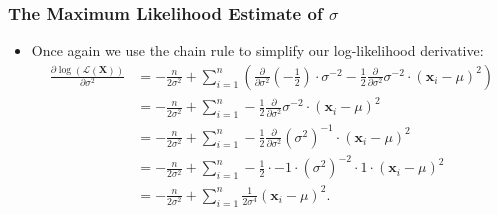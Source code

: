 \begin{frame}
	\frametitle{The Maximum Likelihood Estimate of $\sigma$}
	\begin{itemize}
		\item Once again we use the chain rule to simplify our log-likelihood derivative:
		      \begin{align}
			      \frac{\partial \log\left(\mathcal{L}(\mathbf{X})\right)}{\partial \sigma^2} & = -\frac{n}{2\sigma^2} + \sum_{i=1}^{n} \left(\frac{\partial}{\partial\sigma^2} \left(-\frac{1}{2} \right) \cdot \sigma^{-2} - \frac{1}{2} \frac{\partial}{\partial\sigma^2} \sigma^{-2} \cdot (\mathbf{x}_i-\mu)^2\right) \\
			                                                                                  & =  -\frac{n}{2\sigma^2} + \sum_{i=1}^{n} - \frac{1}{2} \frac{\partial}{\partial\sigma^2} \sigma^{-2} \cdot (\mathbf{x}_i-\mu)^2                                                                                            \\
			                                                                                  & =  -\frac{n}{2\sigma^2} + \sum_{i=1}^{n} - \frac{1}{2} \frac{\partial}{\partial\sigma^2} (\sigma^{2})^{-1} \cdot (\mathbf{x}_i-\mu)^2                                                                                      \\
			                                                                                  & =  -\frac{n}{2\sigma^2} + \sum_{i=1}^{n} - \frac{1}{2} \cdot -1 \cdot (\sigma^{2})^{-2} \cdot 1 \cdot (\mathbf{x}_i-\mu)^2                                                                                                 \\
			                                                                                  & =  -\frac{n}{2\sigma^2} + \sum_{i=1}^{n} \frac{1}{2\sigma^4} (\mathbf{x}_i-\mu)^2.
		      \end{align}
	\end{itemize}
\end{frame}


